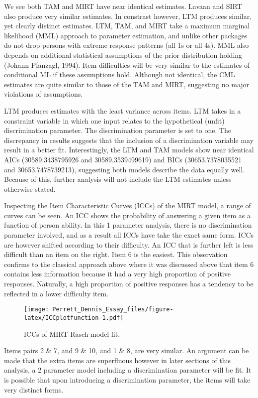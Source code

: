 \documentclass[
  man,floatsintext]{apa6}
\begin{document}
We see both TAM and MIRT have near identical estimates. Lavaan and SIRT also produce very similar estimates. In constrast however, LTM produces similar, yet clearly distinct estimates. LTM, TAM, and MIRT take a maximum marginal likelihood (MML) approach to parameter estimation, and unlike other packages do not drop persons with extreme response patterns (all 1s or all 4s). MML also depends on additional statistical assumptions of the prior distribution holding (Johann Pfanzagl, 1994). Item difficulties will be very similar to the estimates of conditional ML if these assumptions hold. Although not identical, the CML estimates are quite similar to those of the TAM and MIRT, suggesting no major violations of assumptions.

LTM produces estimates with the least variance across items. LTM takes in a constraint variable in which one input relates to the hypothetical (unfit) discrimination parameter. The discrimination parameter is set to one. The discrepancy in results suggests that the inclusion of a discrimination variable may result in a better fit. Interestingly, the LTM and TAM models show near identical AICs (30589.3438795926 and 30589.3539499619) and BICs (30653.7378035521 and 30653.7478739213), suggesting both models describe the data equally well. Because of this, further analysis will not include the LTM estimates unless otherwise stated.

Inspecting the Item Characteristic Curves (ICCs) of the MIRT model, a range of curves can be seen. An ICC shows the probability of answering a given item as a function of person ability. In this 1 parameter analysis, there is no discrimination parameter involved, and as a result all ICCs have take the exact same form. ICCs are however shifted according to their difficulty. An ICC that is further left is less difficult than an item on the right. Item 6 is the easiest. This observation confirms to the classical approach above where it was discussed above that item 6 contains less information because it had a very high proportion of positive responses. Naturally, a high proportion of positive responses has a tendency to be reflected in a lower difficulty item.

\begin{figure}
\centering
\texttt{[image: Perrett\_Dennis\_Essay\_files/figure-latex/ICCplotfunction-1.pdf]}
\caption{\label{fig:ICCplotfunction}ICCs of MIRT Rasch model fit.}
\end{figure}

Items pairs 2 \& 7, and 9 \& 10, and 1 \& 8, are very similar. An argument can be made that the extra items are superfluous however in later sections of this analysis, a 2 parameter model including a discrimination parameter will be fit. It is possible that upon introducing a discrimination parameter, the items will take very distinct forms.
\end{document}
